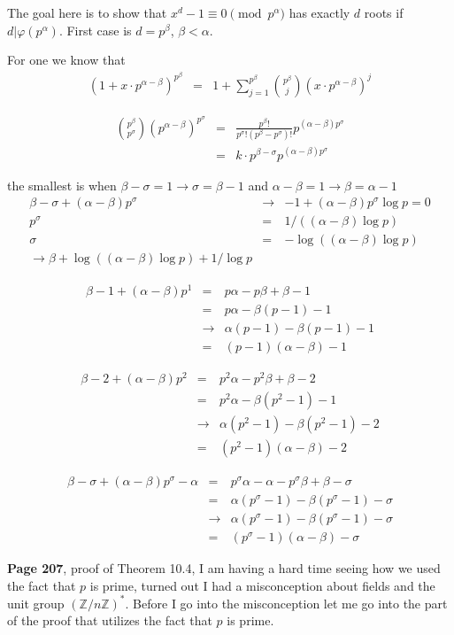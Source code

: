 \documentclass[aps,preprint,preprintnumbers,nofootinbib,showpacs,prd]{revtex4-1}
\newcommand{\nbea}{\begin{eqnarray*}}
\newcommand{\neea}{\end{eqnarray*}}
\begin{document}
The goal here is to show that $x^d - 1 \equiv 0 \pmod{p^\alpha}$ has exactly $d$ roots if $d|\varphi(p^\alpha)$. First case is $d = p^\beta$, $\beta < \alpha$.

For one we know that 
%
\nbea
(1 + x\cdot p^{\alpha-\beta})^{p^\beta} & = & 1 + \sum_{j=1}^{p^\beta}\binom{p^\beta}{j} (x\cdot p^{\alpha-\beta})^j
\neea
%


%
\nbea
\binom{p^\beta}{p^\sigma} (p^{\alpha-\beta})^{p^\sigma} & = & \frac{p^\beta !}{p^\sigma ! (p^\beta - p^\sigma)!} p^{(\alpha-\beta){p^\sigma}} \\
& = & k\cdot p^{\beta - \sigma}p^{(\alpha-\beta){p^\sigma}}
\neea
%

the smallest is when $\beta - \sigma = 1 \to \sigma = \beta - 1$ and $\alpha - \beta = 1 \to \beta = \alpha - 1$
%
\nbea
{\beta - \sigma}+{(\alpha-\beta){p^\sigma}} & \to & -1 + (\alpha-\beta){p^\sigma} \log p = 0 \\
p^\sigma & = & 1/((\alpha-\beta) \log p) \\
\sigma & = & -\log((\alpha-\beta) \log p) \\
\to \beta + \log((\alpha-\beta) \log p) + 1/\log p
\neea
%

%
\nbea
{\beta - 1}+{(\alpha-\beta){p^1}} & = & p\alpha - p\beta + \beta - 1 \\
& = & p\alpha - \beta(p - 1) - 1 \\
& \to & \alpha(p - 1) - \beta(p-1) - 1 \\
& = & (p-1)(\alpha - \beta) - 1
\neea
%

%
\nbea
{\beta - 2}+{(\alpha-\beta){p^2}} & = & p^2\alpha - p^2\beta + \beta - 2 \\
& = & p^2\alpha - \beta(p^2 - 1) - 1 \\
& \to & \alpha(p^2 - 1) - \beta(p^2 - 1) - 2 \\
& = & (p^2-1)(\alpha - \beta) - 2
\neea
%

%
\nbea
{\beta - \sigma}+{(\alpha-\beta){p^\sigma}} - \alpha& = & p^\sigma\alpha - \alpha - p^\sigma\beta + \beta - \sigma \\
& = & \alpha(p^\sigma - 1) - \beta(p^\sigma - 1) - \sigma \\
& \to & \alpha(p^\sigma - 1) - \beta(p^\sigma-1) - \sigma \\
& = & (p^\sigma-1)(\alpha - \beta) - \sigma
\neea
%







{\bf Page 207}, proof of Theorem 10.4, I am having a hard time seeing how we used the fact that $p$ is prime, turned out I had a misconception about fields and the unit group $(\mathbb{Z}/n\mathbb{Z})^*$. Before I go into the misconception let me go into the part of the proof that utilizes the fact that $p$ is prime.
\end{document}
